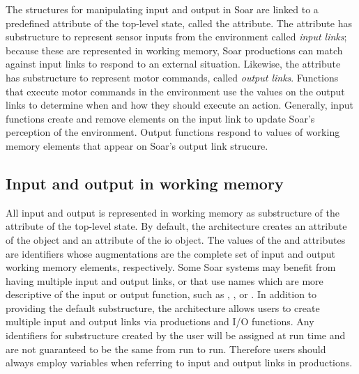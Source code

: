 The structures for manipulating input and output in Soar are linked
to a predefined attribute of the
top-level state, called the  attribute.  The  attribute has
substructure to represent sensor inputs from the environment called
\emph{input links}; because these are represented in working memory, Soar
productions can match against input links to respond to an external
situation. Likewise, the  attribute has substructure to
represent motor commands, called \emph{output links}. Functions that 
execute motor commands in the environment use the values on the output links 
to determine when and how they should execute an action.  Generally,
input functions create and remove elements on the input link to update
Soar's perception of the environment.  Output functions respond to values
of working memory elements that appear on Soar's output link strucure.



\subsection{Input and output in working memory}
\label{ADVANCED-io-wm}

All input and output is represented in working memory as substructure of the
 attribute of the top-level state.  By default, the architecture
creates an  attribute of the  object and
an  attribute of the io object. 
The values of the  and  attributes
are identifiers whose augmentations are the complete set of input and
output working memory elements, respectively.  Some Soar systems may 
benefit from having multiple input and output links, or that use names
which are more
descriptive of the input or output function, such as ,
, or .  In addition to
providing  the default  substructure, the architecture allows
users to create multiple input and output links via productions
and I/O functions.  Any identifiers for  substructure created
by the user will be assigned at run time and are not guaranteed to be
the same from run to run.  Therefore users should always employ
variables when referring to input and output links in productions.

